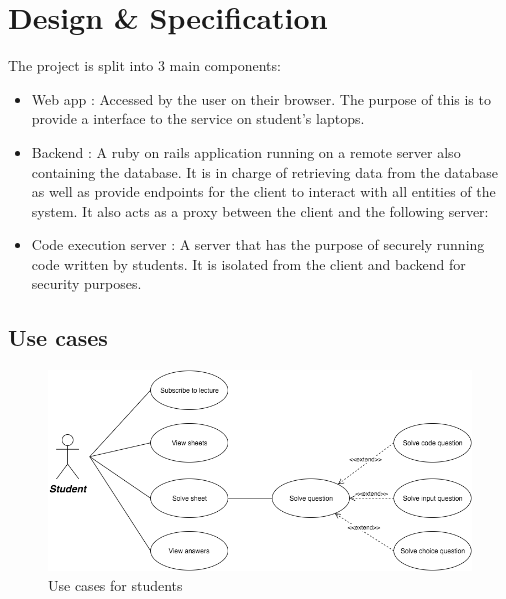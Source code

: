 \chapter{Design \& Specification}

The project is split into 3 main components:
\begin{itemize}
	\item Web app : Accessed by the user on their browser. The purpose of this is to provide a interface to the service on student's laptops.
	\item Backend : A ruby on rails application running on a remote server also containing the database. It is in charge of retrieving data from the database as well as provide endpoints for the client to interact with all entities of the system. It also acts as a proxy between the client and the following server:
	\item Code execution server : A server that has the purpose of securely running code written by students. It is isolated from the client and backend for security purposes.
\end{itemize}


\section{Use cases}
\begin{figure}[H]
  \centering

	\includegraphics[width=\textwidth,height=\textheight,keepaspectratio]{cases}
	\caption{Use cases for students}
\end{figure}

